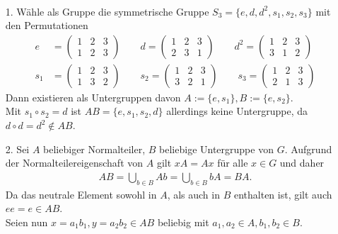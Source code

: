\begin{solution}
\leavevmode \\
\begin{itemize}
  \item [1.] Wähle als Gruppe die symmetrische Gruppe $S_3 = \{e,d,d^2,s_1,s_2,s_3\}$
  mit den Permutationen
  \begin{align*}
  e &= \begin{pmatrix}
      1 & 2 & 3 \\
      1 & 2 & 3
    \end{pmatrix} \qquad
  d = \begin{pmatrix}
    1 & 2 & 3 \\
    2 & 3 & 1
  \end{pmatrix} \qquad
  d^2 = \begin{pmatrix}
    1 & 2 & 3 \\
    3 & 1 & 2
  \end{pmatrix} \\
  s_1 &= \begin{pmatrix}
    1 & 2 & 3 \\
    1 & 3 & 2
  \end{pmatrix} \qquad
  s_2 = \begin{pmatrix}
    1 & 2 & 3 \\
    3 & 2 & 1
  \end{pmatrix} \qquad
  s_3 = \begin{pmatrix}
    1 & 2 & 3 \\
    2 & 1 & 3
  \end{pmatrix}
  \end{align*}
  Dann existieren als Untergruppen davon $A := \{e,s_1\}, B := \{e,s_2\}$. \\
  Mit $s_1 \circ s_2 = d$ ist $AB = \{e,s_1,s_2, d\}$ allerdings keine Untergruppe, da $d \circ d = d^2 \notin AB$.
  \item [2.] Sei $A$ beliebiger Normalteiler, $B$ beliebige Untergruppe von $G$.
  Aufgrund der Normalteilereigenschaft von $A$ gilt $xA = Ax$ für alle
  $x \in G$ und daher
  \begin{align*}
    AB = \bigcup_{b \in B}Ab = \bigcup_{b \in B}bA = BA.
  \end{align*}
  Da das neutrale Element sowohl in $A$, als auch in $B$ enthalten ist, gilt auch
  $ee = e \in AB$. \\
  Seien nun $x= a_1b_1, y = a_2b_2 \in AB$ beliebig mit $a_1,a_2 \in A, b_1,b_2 \in B$. \\
  \begin{align*}

\end{align*}
\end{itemize}
\end{solution}
